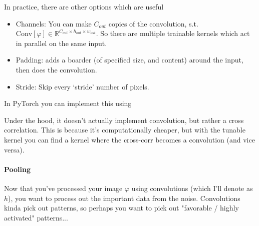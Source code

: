 \begin{sidework}
	In practice, there are other options which are useful
	\begin{itemize}
		\item Channels: You can make $C_{out}$ copies of the convolution, s.t. $\text{Conv}[\varphi] \in \mathbb R^{C_{out} \times h_{out} \times w_{out}}$. So there are multiple trainable kernels which act in parallel on the same input.
		\item Padding: adds a boarder (of specified size, and content) around the input, then does the convolution.
		\item Stride: Skip every `stride' number of pixels.
	\end{itemize}
	
	\noindent
	In PyTorch you can implement this using
	
	\noindent {}
	
	Under the hood, it doesn't actually implement convolution, but rather a cross correlation. This is because it's computationally cheaper, but with the tunable kernel you can find a kernel where the cross-corr becomes a convolution (and vice versa).
\end{sidework}


\paragraph{Pooling}
Now that you've processed your image $\varphi$ using convolutions (which I'll denote as $h$), you want to process out the important data from the noise. Convolutions kinda pick out patterns, so perhaps you want to pick out "favorable / highly activated" patterns... 


